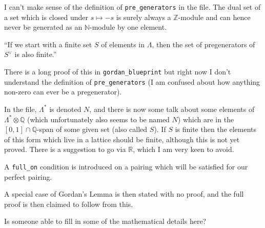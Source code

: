 \documentclass[english]{amsart}
\newcommand{\N}{\mathbb{N}}
\newcommand{\Q}{\mathbb{Q}}
\newcommand{\R}{\mathbb{R}}
\newcommand{\Z}{\mathbb{Z}}
\begin{document}
I can't make sense of the definition of {\tt pre\_generators} in the file. The dual set of a set which is closed under $s\mapsto -s$ is surely always a $\Z$-module and can hence never be generated as an $\N$-module by one element.

``If we start with a finite set $S$ of elements in $\Lambda$, then the set of pregenerators of $S^\vee$ is also finite.''

There is a long proof of this in {\tt gordan\_blueprint} but right now I don't understand the definition of {\tt pre\_generators} (I am confused about how anything non-zero can ever be a pregenerator).

In the file, $\Lambda^*$ is denoted $N$, and there is now some talk about some elements of $\Lambda^*\otimes\Q$ (which unfortunately also seems to be named $N$) which are in the $[0,1]\cap\Q$-span of some given set (also called $S$). If $S$ is finite then the elements of this form which live in a lattice should be finite, although this is not yet proved. There is a suggestion to go via $\R$, which I am very keen to avoid.

A {\tt full\_on} condition is introduced on a pairing which will be satisfied for our perfect pairing.

A special case of Gordan's Lemma is then stated with no proof, and the full proof is then claimed to follow from this.

Is someone able to fill in some of the mathematical details here?
\end{document}
